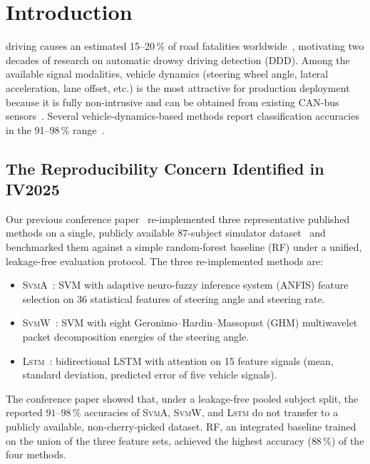 \documentclass[lettersize,journal]{IEEEtran}
\newcommand{\Impl}[1]{\textsc{#1}}
\begin{document}
\section{Introduction}
\label{sec:intro}
 driving causes an estimated 15--20\,\% of road fatalities worldwide~\cite{who2018}, motivating two decades of research on automatic drowsy driving detection (DDD).
Among the available signal modalities, vehicle dynamics (steering wheel angle, lateral acceleration, lane offset, etc.) is the most attractive for production deployment because it is fully non-intrusive and can be obtained from existing CAN-bus sensors~\cite{fu2024,fonseca2025}.
Several vehicle-dynamics-based methods report classification accuracies in the 91--98\,\% range~\cite{arefnezhad2019,zhao2009,wang2022}.

\subsection{The Reproducibility Concern Identified in IV2025}
Our previous conference paper~\cite{nakagama2025iv} re-implemented three representative published methods on a single, publicly available 87-subject simulator dataset~\cite{aygun2024} and benchmarked them against a simple random-forest baseline (\Impl{RF}) under a unified, leakage-free evaluation protocol.
The three re-implemented methods are:
\begin{itemize}
\item \Impl{SvmA}~\cite{arefnezhad2019}: SVM with adaptive neuro-fuzzy inference system (ANFIS) feature selection on 36 statistical features of steering angle and steering rate.
\item \Impl{SvmW}~\cite{zhao2009}: SVM with eight Geronimo--Hardin--Massopust (GHM) multiwavelet packet decomposition energies of the steering angle.
\item \Impl{Lstm}~\cite{wang2022}: bidirectional LSTM with attention on 15 feature signals (mean, standard deviation, predicted error of five vehicle signals).
\end{itemize}
The conference paper showed that, under a leakage-free pooled subject split, the reported $91$--$98\,\%$ accuracies of \Impl{SvmA}, \Impl{SvmW}, and \Impl{Lstm} do not transfer to a publicly available, non-cherry-picked dataset.
\Impl{RF}, an integrated baseline trained on the union of the three feature sets, achieved the highest accuracy ($88\,\%$) of the four methods.
\end{document}
